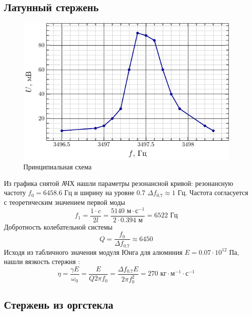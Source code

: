 \subsection{Латунный стержень}
\begin{figure}[H]
	\centering
	\includegraphics[scale=1.5]{fig/lat_afc}
	\caption{Принципиальная схема}
	\label{fig:chem11}
\end{figure}

Из графика снятой АЧХ нашли параметры резонансной кривой: резонансную частоту
$f_0=6458.6\text{ Гц}$ и ширину на уровне 0.7 $\Delta f_{0.7} \approx 1\text{ Гц}$. 
Частота согласуется с теоретическим значением первой моды
\begin{equation}
	f_1 = \frac{1\cdot c}{2l} = \frac{5140 \text{ м}\cdot\text{с}^{-1}}{2\cdot 0.394\text{ м}}=6522 \text{ Гц}
\end{equation}
Добротность колебательной системы
\begin{equation}
	Q = \frac{f_0}{\Delta f_{0.7}} \approx 6450
\end{equation}
Исходя из табличного значения модуля Юнга для алюминия $E=0.07\cdot10^{12}$ Па, нашли вязкость стержня  \cite[стр. 10]{met}:
\begin{equation}
	\eta = \frac{\gamma E}{\omega_0}= \frac{ E}{Q 2\pi f_0} = \frac{\Delta f_{0.7} E}{2\pi f_0^2}= 270 \text{ кг}\cdot\text{м}^{-1}\cdot\text{с}^{-1}
\end{equation}

\subsection{Стержень из оргстекла}

